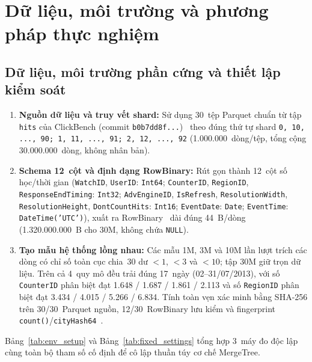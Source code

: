 \documentclass[13pt,a4paper]{report}
\begin{document}
\section{Dữ liệu, môi trường và phương pháp thực nghiệm}

\subsection{Dữ liệu, môi trường phần cứng và thiết lập kiểm soát}
\begin{enumerate}
    \setlength{\itemsep}{3pt}\setlength{\parskip}{0pt}
    \item[\textbf{a.}] \textbf{Nguồn dữ liệu và truy vết shard:} Sử dụng 30~tệp Parquet chuẩn từ tập \texttt{hits} của ClickBench (commit \texttt{b0b7dd8f...})~\cite{B4, B5} theo đúng thứ tự shard \texttt{0, 10, ..., 90; 1, 11, ..., 91; 2, 12, ..., 92} (1.000.000~dòng/tệp, tổng cộng 30.000.000~dòng, không nhân bản).
    \item[\textbf{b.}] \textbf{Schema 12~cột và định dạng RowBinary:} Rút gọn thành 12~cột số học/thời gian (\texttt{WatchID}, \texttt{UserID}: \texttt{Int64}; \texttt{CounterID}, \texttt{RegionID}, \texttt{ResponseEndTiming}: \texttt{Int32}; \texttt{AdvEngineID}, \texttt{IsRefresh}, \texttt{ResolutionWidth}, \texttt{ResolutionHeight}, \texttt{DontCountHits}: \texttt{Int16}; \texttt{EventDate}: \texttt{Date}; \texttt{EventTime}: \texttt{DateTime('UTC')}), xuất ra RowBinary~\cite{S18} dài đúng 44~B/dòng (1.320.000.000~B cho 30M, không chứa \texttt{NULL}).
    \item[\textbf{c.}] \textbf{Tạo mẫu hệ thống lồng nhau:} Các mẫu 1M, 3M và 10M lần lượt trích các dòng có chỉ số toàn cục chia~30 dư $< 1$, $< 3$ và $< 10$; tập 30M giữ trọn dữ liệu. Trên cả 4~quy mô đều trải đúng 17~ngày (02--31/07/2013), với số \texttt{CounterID} phân biệt đạt 1.648 / 1.687 / 1.861 / 2.113 và số \texttt{RegionID} phân biệt đạt 3.434 / 4.015 / 5.266 / 6.834. Tính toàn vẹn xác minh bằng SHA-256 trên 30/30~Parquet nguồn, 12/30~RowBinary lưu kiểm và fingerprint \texttt{count()}/\texttt{cityHash64}~\cite{M5, M6}.
\end{enumerate}

Bảng~\ref{tab:env_setup} và Bảng~\ref{tab:fixed_settings} tổng hợp 3~máy đo độc lập cùng toàn bộ tham số cố định để cô lập thuần túy cơ chế MergeTree.
\end{document}
